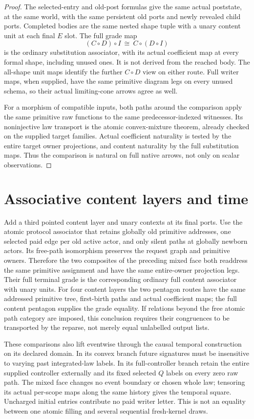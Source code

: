 \documentclass[11pt]{article}\usepackage{amsmath,amssymb,amsthm,geometry}\geometry{margin=1in}
\begin{document}
\begin{proof}
The selected-entry and old-post formulas give the same actual poststate, at the same world, with the same persistent old ports and newly revealed child ports. Completed bodies are the same nested shape tuple with a unary content unit at each final $E$ slot. The full grade map
\[
             (C\circ D)\circ I\ \cong\ C\circ(D\circ I)              \tag{2}
\]
is the ordinary substitution associator, with its actual coefficient map at every formal shape, including unused ones. It is not derived from the reached body. The all-shape unit maps identify the further $C\circ D$ view on either route. Full writer maps, when supplied, have the same primitive diagram legs on every unused schema, so their actual limiting-cone arrows agree as well.

For a morphism of compatible inputs, both paths around the comparison apply the same primitive raw functions to the same predecessor-indexed witnesses. Its noninjective law transport is the atomic convex-mixture theorem, already checked on the supplied target families. Actual coefficient naturality is tested by the entire target owner projections, and content naturality by the full substitution maps. Thus the comparison is natural on full native arrows, not only on scalar observations.\end{proof}

\section{Associative content layers and time}
Add a third pointed content layer and unary contexts at its final ports. Use the atomic protocol associator that retains globally old primitive addresses, one selected paid edge per old active actor, and only silent paths at globally newborn actors. Its free-path isomorphism preserves the request graph and primitive owners. Therefore the two composites of the preceding mixed face both readdress the same primitive assignment and have the same entire-owner projection legs. Their full terminal grade is the corresponding ordinary full content associator with unary units. For four content layers the two pentagon routes have the same addressed primitive tree, first-birth paths and actual coefficient maps; the full content pentagon supplies the grade equality. If relations beyond the free atomic path category are imposed, this conclusion requires their congruences to be transported by the reparse, not merely equal unlabelled output lists.

These comparisons also lift eventwise through the causal temporal construction on its declared domain. In its convex branch future signatures must be insensitive to varying past integrated-law labels. In its full-controller branch retain the entire supplied controller externally and its fixed selected $Q$ labels on every zero raw path. The mixed face changes no event boundary or chosen whole law; tensoring its actual per-scope maps along the same history gives the temporal square. Uncharged initial entries contribute no paid writer letter. This is not an equality between one atomic filling and several sequential fresh-kernel draws.
\end{document}
